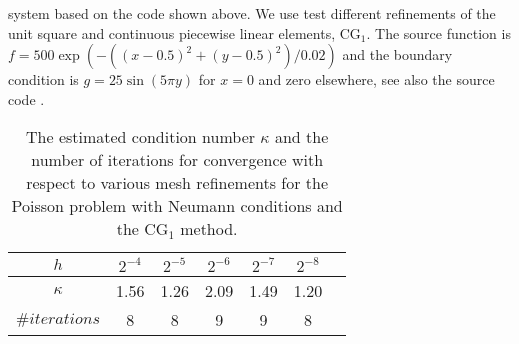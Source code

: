 system based on the code shown above. We use test different
refinements of the unit square and continuous piecewise linear
elements, $\mathrm{CG}_1$. The source function is $f=
500\exp(-((x-0.5)^2 + (y-0.5)^2)/0.02)$ and the boundary condition is
$g = 25 \sin(5\pi y)$ for $x=0$ and zero elsewhere, see also the
source code .
\begin{table}
\begin{center}
\begin{tabular}{|c||c|c|c|c|c|c|}
\hline
$h$ & $2^{-4}$ & $2^{-5}$ & $2^{-6}$ & $2^{-7}$ & $2^{-8}$ \\ \hline
$\kappa$ & 1.56 & 1.26 & 2.09 & 1.49 & 1.20 \\ \hline
$\#iterations$ & 8 & 8 & 9 & 9 & 8 \\ \hline
\end{tabular}
\caption{The estimated condition number $\kappa$ and the number of iterations for
  convergence with respect to various mesh refinements for the Poisson
  problem with Neumann conditions and
  the $\mathrm{CG}_1$ method.}\label{tabel:neumann}
\end{center}
\end{table}


